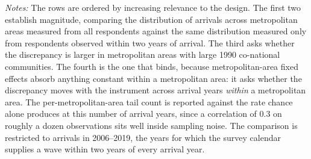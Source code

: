 \begin{table}[!htbp]
\centering
\caption{Metropolitan-Area Attribution in the Actual-Inflow Series, Arrivals 2006-2019}
\label{tab:attribution}
\begin{minipage}{\textwidth}
\footnotesize
\vspace{4pt}
\textit{Notes:} The rows are ordered by increasing relevance to the design. The first two establish magnitude, comparing the distribution of arrivals across metropolitan areas measured from all respondents against the same distribution measured only from respondents observed within two years of arrival. The third asks whether the discrepancy is larger in metropolitan areas with large 1990 co-national communities. The fourth is the one that binds, because metropolitan-area fixed effects absorb anything constant within a metropolitan area: it asks whether the discrepancy moves with the instrument across arrival years \emph{within} a metropolitan area. The per-metropolitan-area tail count is reported against the rate chance alone produces at this number of arrival years, since a correlation of $0.3$ on roughly a dozen observations sits well inside sampling noise. The comparison is restricted to arrivals in 2006--2019, the years for which the survey calendar supplies a wave within two years of every arrival year.
\end{minipage}
\end{table}

